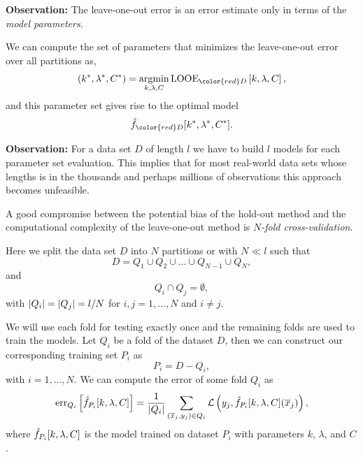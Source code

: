 \documentclass[a4paper,blends,pdf,colorBG,slideColor]{prosper}
\begin{document}
{\bf Observation:} The leave-one-out error
is an error estimate only in terms of the {\em model parameters}.

We can compute the set of parameters that minimizes the leave-one-out error over all partitions as,
\begin{equation*}
(k^*,\lambda^*,C^*) = \argmin_{k,\lambda,C} \text{LOOE}_{\color{red}D}\left [k,\lambda,C \right ] ,
\end{equation*}
and this parameter set gives rise to the optimal model
\begin{equation*}
\model{f}_{\color{red}D}[k^*,\lambda^*,C^*].
\end{equation*}

\es

\vspace{.2in}
{\bf Observation:} For a data set $D$ of length $l$ we have to build $l$ models for each parameter set
evaluation.  
This implies that for most real-world data sets whose lengths is in the thousands and perhaps millions of
observations this approach becomes unfeasible.
\es


\small
A good compromise between the potential bias of the hold-out method and the computational
complexity of the leave-one-out method is {\em $N$-fold cross-validation}.  

Here we split the data set $D$ into $N$ partitions or  with $N \ll l$ such that
\begin{equation*}
D = Q_1\cup Q_2 \cup \ldots \cup Q_{N-1} \cup Q_{N},
\end{equation*}
and
\begin{equation*}
Q_i \cap Q_j = \emptyset,
\end{equation*}
with ${|{Q_i}|} = {|{Q_j}|} = l/N$ for $i,j = 1,\ldots, N$ and $i \ne j$.

We will use each  fold for testing exactly once and the remaining  folds
are used to train the models.   Let $Q_i$  be a
fold of the dataset $D$,
 then we can construct our corresponding training set $P_i$
as
\begin{equation*}
P_i = D - Q_i,
\end{equation*}
with $i = 1,\ldots,N$.
We can compute the error of some fold $Q_i$ as
\begin{equation*}
 \mbox{err}_{Q_i}\left [\hat{f}_{P_i}[k,\lambda,C]\right] = \frac{1}{{|{Q_i}|}}\sum_{(\overline{x}_j, y_j) \in Q_i}{\cal L}\left (y_j,\hat{f}_{P_i}[k,\lambda,C](\overline{x}_j)\right ),
\end{equation*}
where $\hat{f}_{P_i}[k,\lambda,C]$
is the model trained on dataset $P_i$ with parameters $k$, $\lambda$, and $C$.
\end{document}
